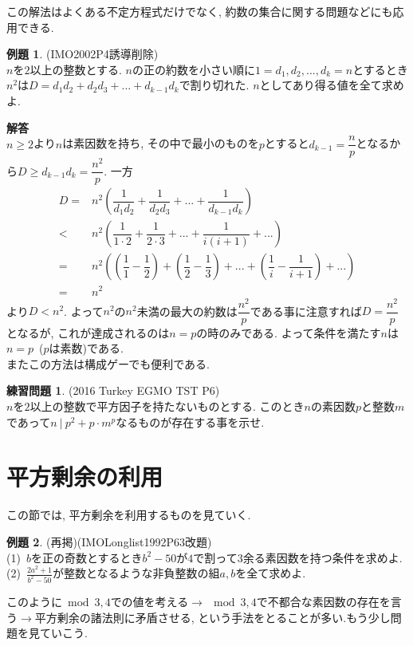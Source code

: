 \documentclass{ltjsarticle}
\theoremstyle{definition}
\newtheorem{prob}{練習問題}
\newtheorem{expr}{例題}
\begin{document}
この解法はよくある不定方程式だけでなく, 約数の集合に関する問題などにも応用できる.
\begin{expr}(IMO2002P4誘導削除)\\
$n$を$2$以上の整数とする. $n$の正の約数を小さい順に$1=d_1,d_2,...,d_k=n$とするとき$n^2$は$D=d_1d_2+d_2d_3+...+d_{k-1}d_k$で割り切れた. $n$としてあり得る値を全て求めよ.
\end{expr}
\textbf{解答}\\
$n\geq2$より$n$は素因数を持ち, その中で最小のものを$p$とすると$d_{k-1}=\dfrac np$となるから$D\geq d_{k-1}d_k=\dfrac{n^2}p$. 一方
\begin{align*}
    D=&n^2(\dfrac1{d_1d_2}+\dfrac1{d_2d_3}+...+\dfrac1{d_{k-1}d_k})\\
    <&n^2(\dfrac1{1\cdot2}+\dfrac1{2\cdot3}+...+\dfrac1{i(i+1)}+...)\\
    =&n^2((\dfrac11-\dfrac12)+(\dfrac12-\dfrac13)+...+(\dfrac1{i}-\dfrac1{i+1})+...)\\
    =&n^2
\end{align*}
より$D<n^2$. よって$n^2$の$n^2$未満の最大の約数は$\dfrac{n^2}p$である事に注意すれば$D=\dfrac{n^2}p$となるが, これが達成されるのは$n=p$の時のみである. よって条件を満たす$n$は$n=p$\ ($p$は素数)である.\\

またこの方法は構成ゲーでも便利である.
\begin{prob}(2016 Turkey EGMO TST P6)\\
$n$を$2$以上の整数で平方因子を持たないものとする. このとき$n$の素因数$p$と整数$m$であって$n\ |\ p^2+p\cdot m^p$なるものが存在する事を示せ.
\end{prob}

\section{平方剰余の利用}
この節では, 平方剰余を利用するものを見ていく.

\setcounter{expr}{0}
\begin{expr}(再掲)(IMOLonglist1992P63改題)\\
(1)\ $b$を正の奇数とするとき$b^2-50$が$4$で割って$3$余る素因数を持つ条件を求めよ.\\
(2)\ $\displaystyle\frac{2a^2+1}{b^2-50}$が整数となるような非負整数の組$a,b$を全て求めよ.
\end{expr}

\setcounter{expr}{6}
このように$\bmod 3,4$での値を考える$\rightarrow\ \bmod 3,4$で不都合な素因数の存在を言う$\rightarrow$平方剰余の諸法則に矛盾させる, という手法をとることが多い.もう少し問題を見ていこう.
\end{document}
